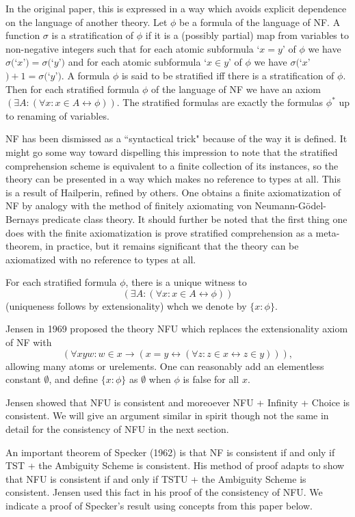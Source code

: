 \documentclass[12pt]{article}
\begin{document}
In the original paper, this is expressed in a way which avoids explicit dependence on the language of another theory.  Let $\phi$ be a formula of the language of
NF.  A function $\sigma$ is a stratification of $\phi$ if it is a (possibly partial) map from variables to non-negative integers such that for each atomic subformula
`$x=y$'  of $\phi$ we have $\sigma($`$x$'$)=\sigma($`$y$'$)$ and for each atomic subformula `$x \in y$' of $\phi$ we have $\sigma($`$x$'$)+1 = \sigma($`$y$'$)$.
A formula $\phi$ is said to be stratified iff there is a stratification of $\phi$.  Then for each stratified formula $\phi$ of the language of NF we have an axiom $(\exists A:(\forall x:x \in A \leftrightarrow \phi))$.  The stratified formulas are exactly the formulas $\phi^*$ up to renaming of variables.

NF has been dismissed as a ``syntactical trick" because of the way it is defined.  It might go some way toward dispelling this impression to note that the stratified comprehension scheme is equivalent to a finite collection of its instances, so the theory can be presented in a way which makes no reference to types at all.  This is a result of Hailperin, refined by others.  One obtains a finite axiomatization of NF by analogy with the method of finitely axiomating von Neumann-G\"odel-Bernays predicate class theory.  It should further be noted that the first thing one does with the finite axiomatization is prove stratified comprehension as a meta-theorem, in practice, but it remains significant that the theory can be axiomatized with no reference to types at all.

For each stratified formula $\phi$, there is a unique witness to $$(\exists A:(\forall x:x \in A \leftrightarrow \phi))$$ (uniqueness follows by extensionality) whch we denote by $\{x:\phi\}$.

Jensen in 1969 proposed the theory NFU which replaces the extensionality axiom of NF with $$(\forall xyw:w \in x \rightarrow (x=y \leftrightarrow (\forall z:z \in x \leftrightarrow z\in y))),$$  allowing many atoms or urelements.  One can reasonably add an elementless constant $\emptyset$, and define $\{x:\phi\}$ as $\emptyset$ when $\phi$ is false for all $x$.

Jensen showed that NFU is consistent and moreoever NFU + Infinity + Choice is consistent.  We will give an argument similar in spirit though not the same in detail for the consistency of NFU in the next section.

An important theorem of Specker (1962) is that NF is consistent if and only if TST + the Ambiguity Scheme is consistent.  His method of proof adapts to show that  NFU is consistent if and only if TSTU + the Ambiguity Scheme is consistent.  Jensen used this fact in his proof of the consistency of NFU.  We indicate a proof of Specker's result using concepts from this paper below.
\end{document}
